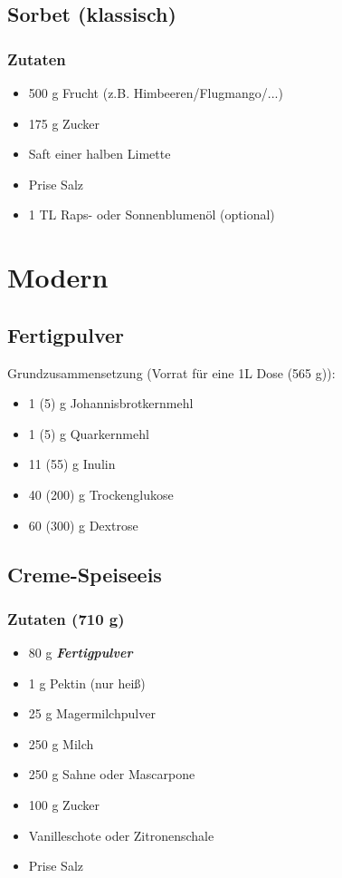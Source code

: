 \documentclass[12pt]{article}
\begin{document}
\subsection {Sorbet (klassisch)}
\subsubsection {Zutaten}
\begin{itemize}
  	\item 500 g Frucht (z.B. Himbeeren/Flugmango/...)
  	\item 175 g Zucker
  	\item Saft einer halben Limette %
  	\item Prise Salz
  	\item 1 TL Raps- oder Sonnenblumenöl (optional) 
\end{itemize}

\pagebreak
\section {Modern}

\subsection{Fertigpulver}

Grundzusammensetzung (Vorrat für eine 1L Dose (565 g)):

\begin{itemize}
  \item 1 (5) g Johannisbrotkernmehl
  \item 1 (5) g Quarkernmehl
  \item 11 (55) g Inulin 
  \item 40 (200) g Trockenglukose
  \item 60 (300) g Dextrose
\end{itemize}


\pagebreak
\subsection {Creme-Speiseeis}

\subsubsection {Zutaten (710 g)}
\begin{itemize}
	\item 80 g \textbf{\textit{Fertigpulver}}
  	\item 1 g Pektin (nur heiß)
  	\item 25 g Magermilchpulver
\end{itemize}
\begin{itemize}
  	\item 250 g Milch 
  	\item 250 g Sahne oder Mascarpone
  	\item 100 g Zucker
  	\item Vanilleschote oder Zitronenschale
  	\item Prise Salz
\end{itemize}
\end{document}
